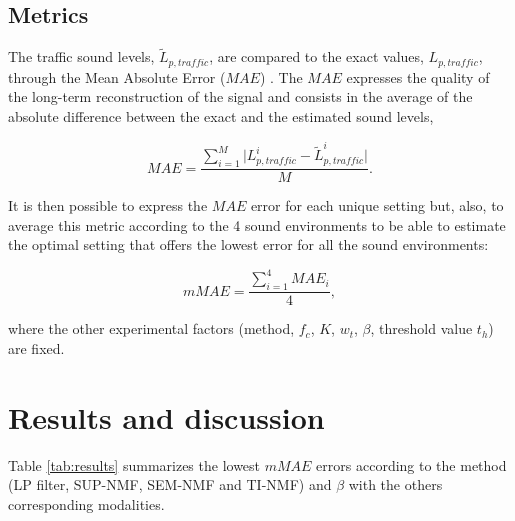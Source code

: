 \documentclass[review,5p,twocolumn,sort&compress,times]{elsarticle}
\begin{document}
\subsection{Metrics}

The traffic sound levels, $\tilde{L}_{p,traffic}$, are compared to the exact values, $L_{p,traffic}$, through the Mean Absolute Error ($MAE$) \cite{willmott2005advantages}. The $MAE$ expresses the quality of the long-term reconstruction of the signal and consists in the average of the absolute difference between the exact and the estimated sound levels, 

\begin{equation}
MAE = \frac{\sum_{i = 1}^{M} \vert L_{p,traffic}^i - \tilde{L}_{p,traffic}^i \vert}{M}.
\end{equation}

It is then possible to express the $MAE$ error for each unique setting but, also, to average this metric according to the 4 sound environments to be able to estimate the optimal setting that offers the lowest error for all the sound environments:

\begin{equation}
mMAE = \frac{\sum_{i = 1}^4 MAE_i}{4}, 
\end{equation}

where the other experimental factors (method, $f_c$, $K$, $w_t$, $\beta$, threshold value $t_h$) are fixed. 


\section{Results and discussion}\label{part:results}

Table \ref{tab:results} summarizes the lowest $mMAE$ errors according to the method (LP filter, SUP-NMF, SEM-NMF and TI-NMF) and $\beta$ with the others corresponding modalities.
\end{document}
